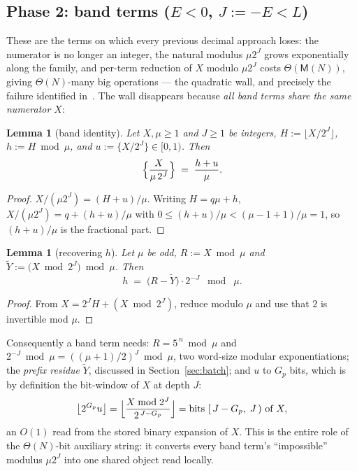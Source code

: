 \documentclass[11pt]{article}
\newtheorem{lemma}[theorem]{Lemma}
\theoremstyle{remark}
\theoremstyle{definition}
\newcommand{\frc}[1]{\{#1\}}
\newcommand{\fl}[1]{\lfloor #1\rfloor}
\newcommand{\M}{\mathsf{M}}
\begin{document}
\subsection{Phase 2: band terms ($E<0$, $J:=-E< L$)}

These are the terms on which every previous decimal approach loses: the
numerator is no longer an integer, the natural modulus $\mu 2^{J}$ grows
exponentially along the family, and per-term reduction of $X$ modulo
$\mu2^J$ costs $\Theta(\M(N))$, giving $\Theta(N)$-many big operations ---
the quadratic wall, and precisely the failure identified
in~\cite[\S3]{Zudilin24}. The wall disappears because \emph{all band terms
share the same numerator $X$}:

\begin{lemma}[band identity]\label{lem:band}
Let $X,\mu\ge 1$ and $J\ge 1$ be integers, $H:=\fl{X/2^{J}}$,
$h:=H\bmod \mu$, and $u:=\frc{X/2^{J}}\in[0,1)$. Then
\[
\Bigl\{\frac{X}{\mu\,2^{J}}\Bigr\} \;=\; \frac{h+u}{\mu}.
\]
\end{lemma}

\begin{proof}
$X/(\mu2^{J})=(H+u)/\mu$. Writing $H=q\mu+h$,
$X/(\mu 2^{J})=q+(h+u)/\mu$ with $0\le (h+u)/\mu<(\mu-1+1)/\mu=1$, so
$(h+u)/\mu$ is the fractional part.
\end{proof}

\begin{lemma}[recovering $h$]\label{lem:h}
Let $\mu$ be odd, $R:=X\bmod\mu$ and
$\widetilde{Y}:=\bigl(X\bmod 2^{J}\bigr)\bmod\mu$. Then
\[
h \;=\; \bigl(R-\widetilde{Y}\bigr)\cdot 2^{-J} \;\bmod\; \mu .
\]
\end{lemma}

\begin{proof}
From $X=2^{J}H+(X\bmod 2^{J})$, reduce modulo $\mu$ and use that $2$ is
invertible mod $\mu$.
\end{proof}

Consequently a band term needs:
$R=5^{\,n}\bmod\mu$ and $2^{-J}\bmod\mu=((\mu+1)/2)^{J}\bmod\mu$, two
word-size modular exponentiations; the \emph{prefix residue}
$\widetilde{Y}$, discussed in Section~\ref{sec:batch}; and $u$ to $G_p$ bits,
which is by definition the bit-window of $X$ at depth $J$:
\[
\bigl\lfloor 2^{G_p}u\bigr\rfloor
=\Bigl\lfloor \frac{X\bmod 2^{J}}{2^{\,J-G_p}}\Bigr\rfloor
=\text{bits } [\,J-G_p,\;J\,) \text{ of } X,
\]
an $O(1)$ read from the stored binary expansion of $X$. This is the entire
role of the $\Theta(N)$-bit auxiliary string: it converts every band term's
``impossible'' modulus $\mu2^{J}$ into one shared object read locally.
\end{document}
